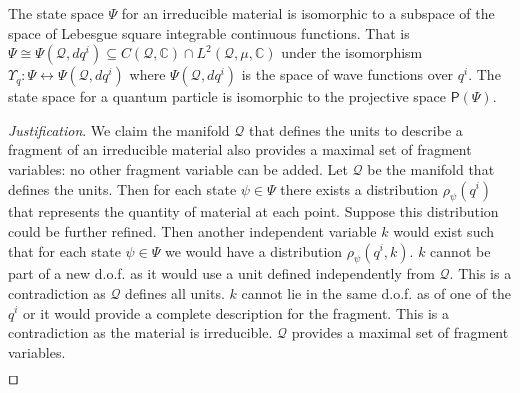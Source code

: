 \documentclass[smallextended]{svjour3}
\numberwithin{equation}{section}
\newenvironment{justification}{\emph{Justification}.}{\hfill\(\qed\)}
\begin{document}
\begin{prop}\label{prop:wavefuntion}
	The state space $\Psi$ for an irreducible material is isomorphic to a subspace of the space of Lebesgue square integrable continuous functions. That is $\Psi \cong \Psi(\mathcal{Q}, dq^i) \subseteq C(\mathcal{Q}, \mathbb{C}) \cap L^2(\mathcal{Q}, \mu, \mathbb{C})$ under the isomorphism $\Upsilon_q : \Psi \leftrightarrow \Psi(\mathcal{Q}, dq^i)$ where $\Psi(\mathcal{Q}, dq^i)$ is the space of wave functions over $q^i$. The state space for a quantum particle is isomorphic to the projective space $\mathsf{P}(\Psi)$.
\end{prop}

\begin{justification}
	We claim the manifold $\mathcal{Q}$ that defines the units to describe a fragment of an irreducible material also provides a maximal set of fragment variables: no other fragment variable can be added. Let $\mathcal{Q}$ be the manifold that defines the units. Then for each state $\psi \in \Psi$ there exists a distribution $\rho_\psi(q^i)$ that represents the quantity of material at each point. Suppose this distribution could be further refined. Then another independent variable $k$ would exist such that for each state $\psi \in \Psi$ we would have a distribution $\rho_\psi(q^i, k)$. $k$ cannot be part of a new d.o.f. as it would use a unit defined independently from $\mathcal{Q}$. This is a contradiction as $\mathcal{Q}$ defines all units. $k$ cannot lie in the same d.o.f. as of one of the $q^i$ or it would provide a complete description for the fragment. This is a contradiction as the material is irreducible. $\mathcal{Q}$ provides a maximal set of fragment variables.
	

\end{justification}
\end{document}
